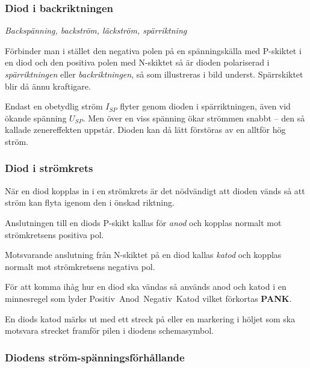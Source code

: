 \subsubsection{Diod i backriktningen}

\emph{Backspänning, backström, läckström, spärriktning}

Förbinder man i stället den negativa polen på en spänningskälla med P-skiktet i
en diod och den positiva polen med N-skiktet så är dioden polariserad i
\emph{spärriktningen} eller \emph{backriktningen}, så som illustreras i
bild  underst.
Spärrskiktet blir då ännu kraftigare.

Endast en obetydlig ström \(I_{SP}\) flyter genom dioden i spärriktningen, även vid 
ökande spänning \(U_{SP}\).
Men över en viss spänning ökar strömmen snabbt -- den så kallade zenereffekten
uppstår.
Dioden kan då lätt förstöras av en alltför hög ström.

\subsubsection{Diod i strömkrets}

När en diod kopplas in i en strömkrets är det nödvändigt att dioden vänds så att
ström kan flyta igenom den i önskad riktning.

Anslutningen till en diods P-skikt kallas för \emph{anod} och kopplas normalt
mot strömkretsens positiva pol.

Motsvarande anslutning från N-skiktet på en diod kallas \emph{katod} och kopplas
normalt mot strömkretsens negativa pol.

\newpage
För att komma ihåg hur en diod ska vändas så används anod och katod i en
minnesregel som lyder Positiv~Anod~Negativ~Katod vilket förkortas \textbf{PANK}.

En diods katod märks ut med ett streck på eller en markering i höljet som ska
motsvara strecket framför pilen i diodens schemasymbol.

\subsubsection{Diodens ström-spänningsförhållande}


